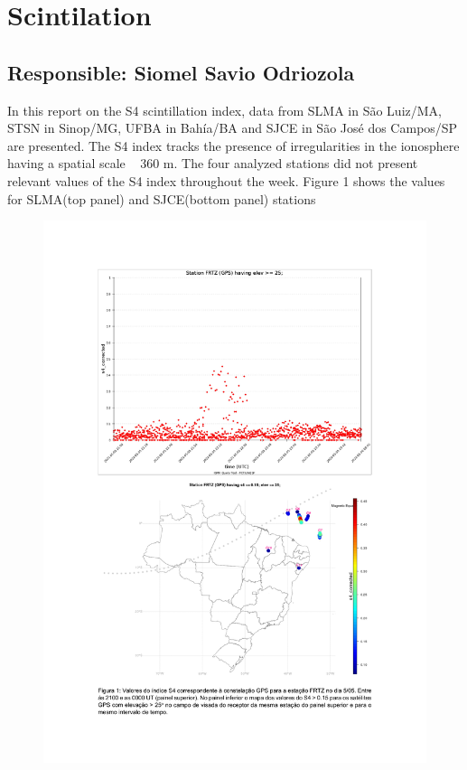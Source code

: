 \documentclass[a4paper, 10pt]{article}
\begin{document}
\section{Scintilation} 
 \subsection{Responsible: Siomel Savio Odriozola} 
 
In this report on the S4 scintillation index, data from SLMA in São Luiz/MA, STSN 
in Sinop/MG, UFBA in Bahía/BA and SJCE in São José dos Campos/SP are 
presented. The S4 index tracks the presence of irregularities in the ionosphere 
having a spatial scale ~ 360 m. 
The four analyzed stations did not present relevant values of the S4 index 
throughout the week. Figure 1 shows the values for SLMA(top panel) and 
SJCE(bottom panel) stations 

    \begin{figure}[H]
        \centering
        \includegraphics[width=14cm]{./figures/en_outfileScint_0.jpg}
    \end{figure} 
 
\end{document}

